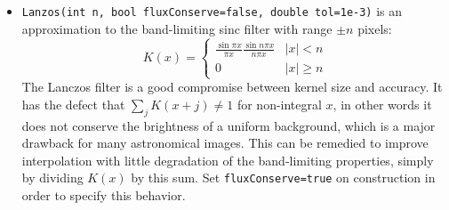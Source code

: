 \documentclass[11pt,preprint,flushrt]{aastex}
\begin{document}
\begin{itemize}
\item {\tt Lanzos(int n, bool fluxConserve=false, double tol=1e-3)} is an approximation to the band-limiting sinc filter with range $\pm n$ pixels:
\begin{equation}
K(x) = \left\{ \begin{array}{cl}
\frac{\sin \pi x}{\pi x} \frac{\sin n \pi x}{n \pi x} & |x|<n \\
0 & |x| \ge n
\end{array}
\right.
\end{equation}
The Lanczos filter is a good compromise between kernel size and accuracy.  It has the defect that $\sum_j K(x+j) \ne 1$ for non-integral $x$, in other words it does not conserve the brightness of a uniform background, which is a major drawback for many astronomical images.  This can be remedied to improve interpolation with little degradation of the band-limiting properties, simply by dividing $K(x)$ by this sum.  Set {\tt fluxConserve=true} on construction in order to specify this behavior.
\end{itemize}
\end{document}
